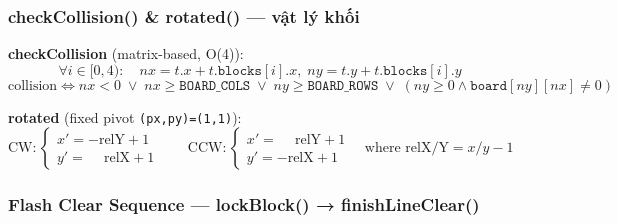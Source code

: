\documentclass[12pt,a4paper]{article}
\begin{document}
\subsubsection{checkCollision() \& rotated() --- vật lý khối}

\noindent\textbf{checkCollision} (matrix-based, O(4)):
\[
  \forall i \in [0,4):
  \quad nx = t.x + t.\texttt{blocks}[i].x,\;
        ny = t.y + t.\texttt{blocks}[i].y
\]
\[
  \text{collision} \iff nx < 0 \;\vee\; nx \geq \texttt{BOARD\_COLS}
    \;\vee\; ny \geq \texttt{BOARD\_ROWS}
    \;\vee\; (ny \geq 0 \wedge \texttt{board}[ny][nx] \neq 0)
\]

\noindent\textbf{rotated} (fixed pivot \texttt{(px,py)=(1,1)}):
\[
  \text{CW}: \begin{cases}
    x' = -\text{relY} + 1 \\
    y' = \phantom{-}\text{relX} + 1
  \end{cases}
  \qquad
  \text{CCW}: \begin{cases}
    x' = \phantom{-}\text{relY} + 1 \\
    y' = -\text{relX} + 1
  \end{cases}
  \quad \text{where relX/Y} = x/y - 1
\]

\subsubsection{Flash Clear Sequence --- lockBlock() → finishLineClear()}
\end{document}
